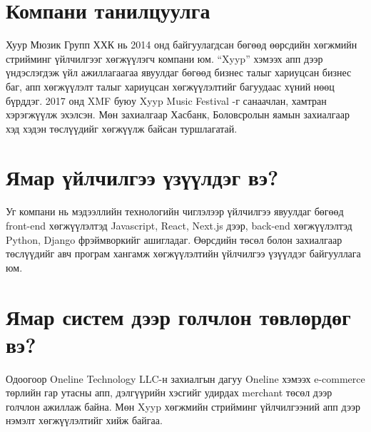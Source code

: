 \section{Компани танилцуулга}
	\quad \quad	Хуур Мюзик Групп ХХК нь 2014 онд байгуулагдсан бөгөөд өөрсдийн хөгжмийн стрийминг үйлчилгээг хөгжүүлэгч компани юм. “Xyyp” хэмээх апп дээр үндэслэгдэж үйл ажиллагаагаа явуулдаг бөгөөд бизнес талыг хариуцсан бизнес баг, апп хөгжүүлэлт талыг хариуцсан хөгжүүлэлтийг багуудаас хүний нөөц бүрддэг. 2017 онд XMF буюу Xyyp Music Festival -г санаачлан, хамтран хэрэгжүүлж эхэлсэн. Мөн захиалгаар Хасбанк, Боловсролын яамын захиалгаар хэд хэдэн төслүүдийг хөгжүүлж байсан туршлагатай.

\section{ Ямар үйлчилгээ үзүүлдэг вэ?}
	\quad \quad	Уг компани нь мэдээллийн технологийн чиглэлээр үйлчилгээ явуулдаг бөгөөд front-end хөгжүүлэлтэд Javascript, React, Next.js дээр, back-end хөгжүүлэлтэд Python, Django фрэймворкийг ашигладаг. Өөрсдийн төсөл болон захиалгаар төслүүдийг авч програм хангамж хөгжүүлэлтийн үйлчилгээ үзүүлдэг байгууллага юм. 
     

\section{Ямар систем дээр голчлон төвлөрдөг вэ? }
	\quad \quad	Одоогоор Oneline Technology LLC-н захиалгын дагуу Oneline хэмээх e-commerce төрлийн гар утасны апп, дэлгүүрийн хэсгийг удирдах merchant төсөл дээр голчлон ажиллаж байна. Мөн Xyyp хөгжмийн стрийминг үйлчилгээний апп дээр нэмэлт хөгжүүлэлтийг хийж байгаа.


